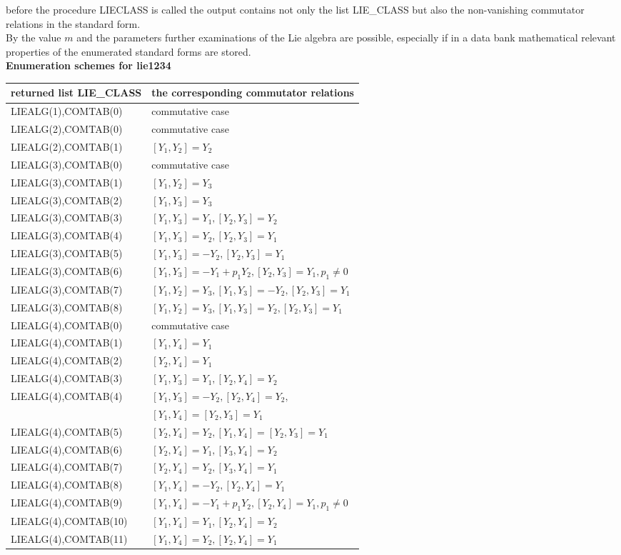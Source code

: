 before the procedure LIECLASS is called the output contains not only the
list LIE\_CLASS but also the non-vanishing commutator relations in the
standard form.\\[0.1cm]
By the value $m$ and the parameters further examinations of the Lie algebra
are possible, especially if in a data bank mathematical relevant properties
of the enumerated standard forms are stored.\\[0.3cm]
{\large\bf Enumeration schemes for lie1234}\\[0.2cm]
\hspace*{0.3cm}\begin{tabular}{l|l}returned list LIE\_CLASS&
the corresponding commutator relations\\[0.1cm]\hline
{LIEALG(1),COMTAB(0)}&commutative case\\[0.1cm]\hline
{LIEALG(2),COMTAB(0)}&commutative case\\[0.1cm]
{LIEALG(2),COMTAB(1)}&$[Y_1,Y_2]=Y_2$\\[0.1cm]\hline
{LIEALG(3),COMTAB(0)}&commutative case\\[0.1cm]
{LIEALG(3),COMTAB(1)}&$[Y_1,Y_2]=Y_3$\\[0.1cm]
{LIEALG(3),COMTAB(2)}&$[Y_1,Y_3]=Y_3$\\[0.1cm]
{LIEALG(3),COMTAB(3)}&$[Y_1,Y_3]=Y_1,[Y_2,Y_3]=Y_2$\\[0.1cm]
{LIEALG(3),COMTAB(4)}&$[Y_1,Y_3]=Y_2,[Y_2,Y_3]=Y_1$\\[0.1cm]
{LIEALG(3),COMTAB(5)}&$[Y_1,Y_3]=-Y_2,[Y_2,Y_3]=Y_1$\\[0.1cm]
{LIEALG(3),COMTAB(6)}&$[Y_1,Y_3]=-Y_1+p_1 Y_2,[Y_2,Y_3]=Y_1,p_1\neq 0$\\[0.1cm]
{LIEALG(3),COMTAB(7)}&$[Y_1,Y_2]=Y_3,[Y_1,Y_3]=-Y_2,[Y_2,Y_3]=Y_1$\\[0.1cm]
{LIEALG(3),COMTAB(8)}&$[Y_1,Y_2]=Y_3,[Y_1,Y_3]=Y_2,[Y_2,Y_3]=Y_1$\\[0.1cm]\hline
{LIEALG(4),COMTAB(0)}&commutative case\\[0.1cm]
{LIEALG(4),COMTAB(1)}&$[Y_1,Y_4]=Y_1$\\[0.1cm]
{LIEALG(4),COMTAB(2)}&$[Y_2,Y_4]=Y_1$\\[0,1cm]
{LIEALG(4),COMTAB(3)}&$[Y_1,Y_3]=Y_1,[Y_2,Y_4]=Y_2$\\[0.1cm]
{LIEALG(4),COMTAB(4)}&$[Y_1,Y_3]=-Y_2,[Y_2,Y_4]=Y_2,$\\
                     &$[Y_1,Y_4]=[Y_2,Y_3]=Y_1$\\[0.1cm]
{LIEALG(4),COMTAB(5)}&$[Y_2,Y_4]=Y_2,[Y_1,Y_4]=[Y_2,Y_3]=Y_1$\\[0.1cm]
{LIEALG(4),COMTAB(6)}&$[Y_2,Y_4]=Y_1,[Y_3,Y_4]=Y_2$\\[0.1cm]
{LIEALG(4),COMTAB(7)}&$[Y_2,Y_4]=Y_2,[Y_3,Y_4]=Y_1$\\[0.1cm]
{LIEALG(4),COMTAB(8)}&$[Y_1,Y_4]=-Y_2,[Y_2,Y_4]=Y_1$\\[0.1cm]
{LIEALG(4),COMTAB(9)}&$[Y_1,Y_4]=-Y_1+p_1 Y_2,[Y_2,Y_4]=Y_1,p_1\neq 0$\\[0.1cm]
{LIEALG(4),COMTAB(10)}&$[Y_1,Y_4]=Y_1,[Y_2,Y_4]=Y_2$\\[0.1cm]
{LIEALG(4),COMTAB(11)}&$[Y_1,Y_4]=Y_2,[Y_2,Y_4]=Y_1$
\end{tabular}\\

